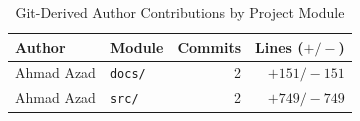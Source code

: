 \begin{table}[!htbp]
\centering
\caption{Git-Derived Author Contributions by Project Module}
\label{tab:contributions}
\footnotesize
\begin{tabularx}{\linewidth}{X l r r}
\toprule
\textbf{Author} & \textbf{Module} & \textbf{Commits} & \textbf{Lines ($+/-$)} \\
\midrule
Ahmad Azad & \texttt{docs/} & 2 & $+151 / -151$ \\
Ahmad Azad & \texttt{src/} & 2 & $+749 / -749$ \\
\bottomrule
\end{tabularx}
\end{table}